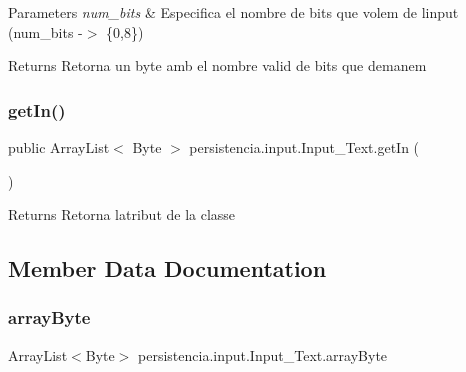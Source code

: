 \begin{DoxyParams}{Parameters}
{\em num\+\_\+bits} & Especifica el nombre de bits que volem de l\textquotesingle{}input (num\+\_\+bits -\/$>$ \{0,8\}) \\
\hline
\end{DoxyParams}
\begin{DoxyReturn}{Returns}
Retorna un byte amb el nombre valid de bits que demanem 
\end{DoxyReturn}
\mbox{\label{classpersistencia_1_1input_1_1Input__Text_a36c0224f7ac8f3a60a80bacc571dd3be}} 
\subsubsection{\texorpdfstring{get\+In()}{getIn()}}
{\footnotesize\ttfamily public Array\+List$<$ Byte $>$ persistencia.\+input.\+Input\+\_\+\+Text.\+get\+In (\begin{DoxyParamCaption}{ }\end{DoxyParamCaption})\hspace{0.3cm}{\ttfamily [inline]}}

\begin{DoxyReturn}{Returns}
Retorna l\textquotesingle{}atribut de la classe 
\end{DoxyReturn}


\subsection{Member Data Documentation}
\mbox{\label{classpersistencia_1_1input_1_1Input__Text_ab29b20f25abf37ab5fa9fd86e446fdf5}} 
\subsubsection{\texorpdfstring{array\+Byte}{arrayByte}}
{\footnotesize\ttfamily Array\+List$<$Byte$>$ persistencia.\+input.\+Input\+\_\+\+Text.\+array\+Byte\hspace{0.3cm}{\ttfamily [package]}}


